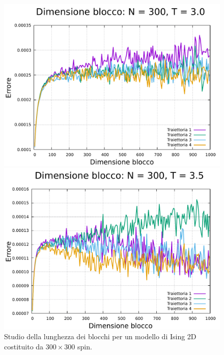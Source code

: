 \begin{figure}[htbp]
    \begin{minipage}{0.45\textwidth}  
      \centering
      \includegraphics[page=1, width=\textwidth]{Immagini/simIsing2D/metro/lblk/err_300_3.0.pdf}
      \caption{$T\,=\,3.0$}
    \end{minipage}\hfill
    \begin{minipage}{0.45\textwidth}  
      \centering
      \includegraphics[page=1, width=\textwidth]{Immagini/simIsing2D/metro/lblk/err_300_3.5.pdf}
      \caption{$T\,=\,3.5$}
    \end{minipage}
    \caption{Studio della lunghezza dei blocchi per un modello di Ising 2D costituito da $300 \times 300$ spin.}
\end{figure}

